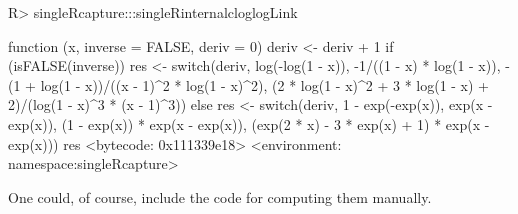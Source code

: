 \documentclass[
]{jss}
\newcommand{\1}{\mathcal{I}} \newcommand{\bZero}{\boldsymbol{0}}
\begin{document}
\begin{CodeChunk}
\begin{CodeInput}
R> singleRcapture:::singleRinternalcloglogLink
\end{CodeInput}
\begin{CodeOutput}
function (x, inverse = FALSE, deriv = 0) 
{
    deriv <- deriv + 1
    if (isFALSE(inverse)) {
        res <- switch(deriv, log(-log(1 - x)), -1/((1 - x) * 
            log(1 - x)), -(1 + log(1 - x))/((x - 1)^2 * log(1 - 
            x)^2), (2 * log(1 - x)^2 + 3 * log(1 - x) + 2)/(log(1 - 
            x)^3 * (x - 1)^3))
    }
    else {
        res <- switch(deriv, 1 - exp(-exp(x)), exp(x - exp(x)), 
            (1 - exp(x)) * exp(x - exp(x)), (exp(2 * x) - 3 * 
                exp(x) + 1) * exp(x - exp(x)))
    }
    res
}
<bytecode: 0x111339e18>
<environment: namespace:singleRcapture>
\end{CodeOutput}
\end{CodeChunk}

\normalsize

One could, of course, include the code for computing them manually.


\end{document}
